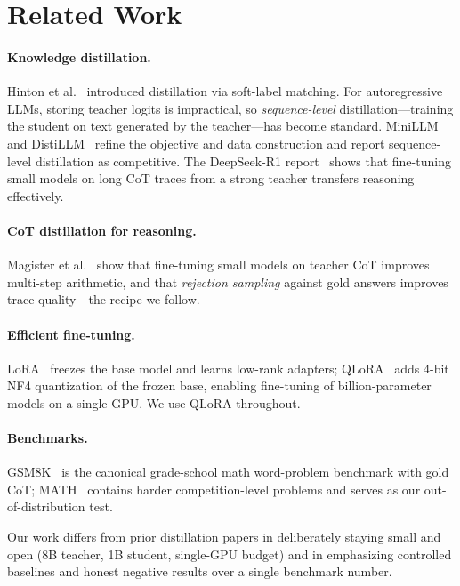 \documentclass[11pt]{article}
\begin{document}
\section{Related Work}
\paragraph{Knowledge distillation.} Hinton et al.~\cite{hinton2015} introduced
distillation via soft-label matching. For autoregressive LLMs, storing teacher
logits is impractical, so \emph{sequence-level} distillation---training the student
on text generated by the teacher---has become standard. MiniLLM~\cite{minillm} and
DistiLLM~\cite{distillm} refine the objective and data construction and report
sequence-level distillation as competitive. The DeepSeek-R1 report~\cite{deepseekr1}
shows that fine-tuning small models on long CoT traces from a strong teacher
transfers reasoning effectively.

\paragraph{CoT distillation for reasoning.} Magister et al.~\cite{magister2023}
show that fine-tuning small models on teacher CoT improves multi-step arithmetic,
and that \emph{rejection sampling} against gold answers improves trace quality---the
recipe we follow.

\paragraph{Efficient fine-tuning.} LoRA~\cite{lora} freezes the base model and
learns low-rank adapters; QLoRA~\cite{qlora} adds 4-bit NF4 quantization of the
frozen base, enabling fine-tuning of billion-parameter models on a single GPU. We
use QLoRA throughout.

\paragraph{Benchmarks.} GSM8K~\cite{gsm8k} is the canonical grade-school math
word-problem benchmark with gold CoT; MATH~\cite{math} contains harder
competition-level problems and serves as our out-of-distribution test.

Our work differs from prior distillation papers in deliberately staying small and
open (8B teacher, 1B student, single-GPU budget) and in emphasizing controlled
baselines and honest negative results over a single benchmark number.
\end{document}
